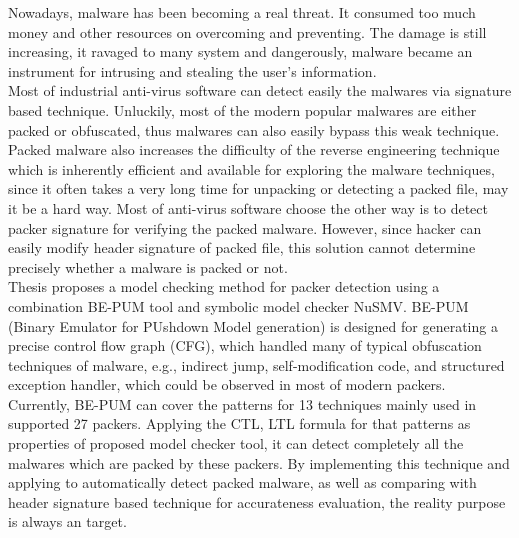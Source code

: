 \setlength\parindent{0pt}
\hspace{0.5cm}Nowadays, malware has been becoming a real threat. It consumed too much money and other resources on overcoming and preventing. The damage is still increasing, it ravaged to many system and dangerously, malware became an instrument for intrusing and stealing the user's information.\\

\hspace{0.5cm}Most of industrial anti-virus software can detect easily the malwares via signature based technique. Unluckily, most of the modern popular malwares are either packed or obfuscated, thus malwares can also easily bypass this weak technique. Packed malware also increases the difficulty of the reverse engineering technique which is inherently efficient and available for exploring the malware techniques, since it often takes a very long time for unpacking or detecting a packed file, may it be a hard way. Most of anti-virus software choose the other way is to detect packer signature for verifying the packed malware. However, since hacker can easily modify header signature of packed file, this solution cannot determine precisely whether a malware is packed or not.\\

\hspace{0.5cm}Thesis proposes a model checking method for packer detection using a combination BE-PUM tool and symbolic model checker NuSMV. BE-PUM (Binary Emulator for PUshdown Model generation) is designed for generating a precise control flow graph (CFG), which handled many of typical obfuscation techniques of malware, e.g., indirect jump, self-modification code, and structured exception handler, which could be observed in most of modern packers. Currently, BE-PUM can cover the patterns for 13 techniques mainly used in supported 27 packers. Applying the CTL, LTL formula for that patterns as properties of proposed model checker tool, it can detect completely all the malwares which are packed by these packers. By implementing this technique and applying to automatically detect packed malware, as well as comparing with header signature based technique for accurateness evaluation, the reality purpose is always an target.\\
